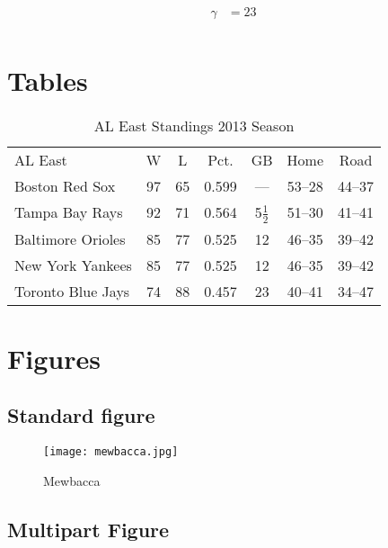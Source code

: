 \documentclass[12pt,a4paper]{article}
\begin{document}
  \begin{align}
    \gamma &= 23 \\
  \end{align}

\newpage

  \section{Tables}
    \begin{table}[ht!]
      \centering
        \begin{tabular}{lcccccc}
          AL East & W & L & Pct. & GB & Home & Road \\
          Boston Red Sox & 97 & 65 & 0.599 & — & 53–28 & 44–37\\
          Tampa Bay Rays & 92 & 71 & 0.564 & 5$\frac{1}{2}$ & 51–30 & 41–41\\
          Baltimore Orioles & 85 & 77 & 0.525 & 12 & 46–35 & 39–42\\
          New York Yankees & 85 & 77 & 0.525 & 12 & 46–35 & 39–42\\
          Toronto Blue Jays & 74 & 88 & 0.457 & 23 & 40–41 & 34–47\\
        \end{tabular}
      \caption{AL East Standings 2013 Season\label{tab:aleast2013}}
    \end{table}

    \clearpage

\section{Figures}
    \subsection{Standard figure}

    \begin{figure}[ht!]
      \centering
      \texttt{[image: mewbacca.jpg]}
      \caption{Mewbacca \label{fig:mewbacca}}
    \end{figure}
   

    \subsection{Multipart Figure}

\end{document}
